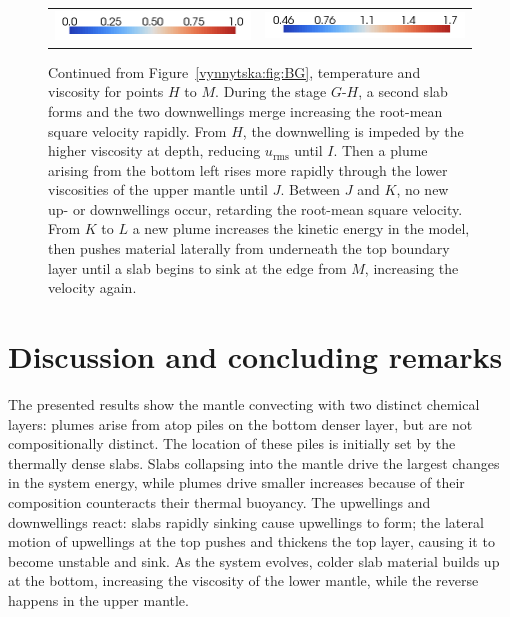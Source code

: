 \begin{figure}
\begin{center}
\begin{tabular}{c r}
\includegraphics[width=0.45\columnwidth]{chapters/vynnytska/png/tmleg.png} &
\includegraphics[width=0.45\columnwidth]{chapters/vynnytska/png/visleg.png}
\end{tabular}
\end{center}
\label{vynnytska:fig:HM}
\caption{Continued from Figure~\ref{vynnytska:fig:BG}, temperature and
  viscosity for points $H$ to $M$. During the stage $G$-$H$, a second
  slab forms and the two downwellings merge increasing the root-mean
  square velocity rapidly. From $H$, the downwelling is impeded by the
  higher viscosity at depth, reducing $u_{\mathrm{rms}}$ until $I$. Then a
  plume arising from the bottom left rises more rapidly through the
  lower viscosities of the upper mantle until $J$. Between $J$ and
  $K$, no new up- or downwellings occur, retarding the root-mean
  square velocity. From $K$ to $L$ a new plume increases the kinetic
  energy in the model, then pushes material laterally from underneath
  the top boundary layer until a slab begins to sink at the edge from
  $M$, increasing the velocity again.}
\end{figure}


\section{Discussion and concluding remarks}

The presented results show the mantle convecting with two
distinct chemical layers: plumes arise from atop piles on the bottom
denser layer, but are not compositionally distinct. The location of
these piles is initially set by the thermally dense slabs. Slabs
collapsing into the mantle drive the largest changes in the system
energy, while plumes drive smaller increases because of their
composition counteracts their thermal buoyancy. The upwellings and
downwellings react: slabs rapidly sinking cause upwellings to form;
the lateral motion of upwellings at the top pushes and thickens the
top layer, causing it to become unstable and sink. As the system
evolves, colder slab material builds up at the bottom, increasing the
viscosity of the lower mantle, while the reverse happens in the upper
mantle.

